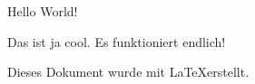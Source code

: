 \documentclass{minimal}
\begin{document}
    Hello World!

    Das ist ja cool. 
    Es funktioniert endlich!

    Dieses Dokument wurde mit \LaTeX erstellt.
\end{document}
